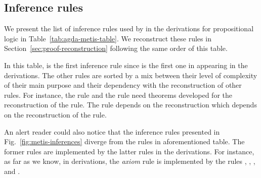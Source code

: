 \documentclass[../main.tex]{subfiles}
\begin{document}
\subsection{Inference rules}
\label{ssec:metis-inferences-rules}

We present the list of inference rules used by \Metis in the \TSTP derivations
for propositional logic in Table~\ref{tab:agda-metis-table}. We reconstruct
these rules in Section~\ref{sec:proof-reconstruction} following the same order
of this table.

In this table, \strip is the first inference rule since is the first
one in appearing in the \TSTP derivations. The other rules are sorted
by a mix between their level of complexity of their main purpose and
their dependency with the reconstruction of other rules. For
instance, the \simplify rule and the \clausify rule need theorems
developed for the reconstruction of the \canonicalize rule. The
\canonicalize rule depends on the \resolve reconstruction which
depends on the reconstruction of the \conjunct rule.

An alert reader could also notice that the inference rules presented in
Fig.~\ref{fig:metis-inferences} diverge from the rules in
aforementioned table. The former rules are implemented by the latter
rules in the \TSTP derivations. For instance, as far as we know, in
\TSTP derivations,  the \emph{axiom} rule is implemented by the rules
\canonicalize, \clausify, \conjunct, and \simplify.

\end{document}
